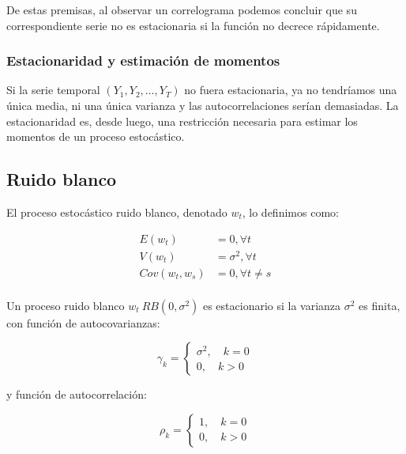 \documentclass[a4paper,10pt]{article}
\begin{document}
De estas premisas, al observar un correlograma podemos concluir que su correspondiente serie no es estacionaria si la función no decrece rápidamente.

\subsubsection{Estacionaridad y estimación de momentos}

Si la serie temporal $(Y_1,Y_2,...,Y_T)$ no fuera estacionaria, ya no tendríamos una única media, ni una única varianza y las autocorrelaciones serían demasiadas. La estacionaridad es, desde luego, una restricción necesaria para estimar los momentos de un proceso estocástico.

\subsection{Ruido blanco}

El proceso estocástico ruido blanco, denotado $w_t$, lo definimos como:

\begin{equation*}
\begin{split}
E(w_t) &= 0, \forall t \\
V(w_t) &= \sigma^2, \forall t \\
Cov(w_t,w_s) &= 0, \forall t \neq s \\
\end{split}
\end{equation*}

Un proceso ruido blanco $w_t ~ RB(0,\sigma^2)$ es estacionario si la varianza $\sigma^2$ es finita, con función de autocovarianzas:

\begin{equation*}
\gamma_k= \left\{ \begin{array}{lcc}
             \sigma^2, \quad k=0 \\
             0, \quad k > 0
             \end{array}
   \right.
\end{equation*}

y función de autocorrelación:

\begin{equation*}
\rho_k= \left\{ \begin{array}{lcc}
             1, \quad k=0 \\
             0, \quad k > 0
             \end{array}
   \right.
\end{equation*}
\end{document}
